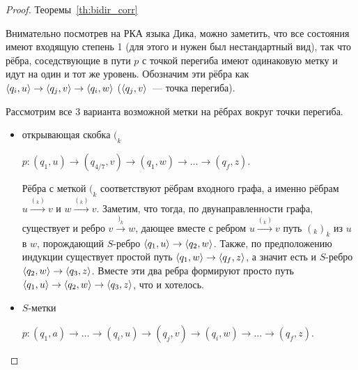 \begin{proof}{Теоремы~\ref{th:bidir_corr}}



  Внимательно посмотрев на РКА языка Дика, можно заметить, что все состояния имеют входящую степень 1 (для этого и нужен был нестандартный вид), так что рёбра, соседствующие в пути $p$ с точкой перегиба имеют одинаковую метку и идут на один и тот же уровень. Обозначим эти рёбра как $\langle q_i, u \rangle \rightarrow \langle q_j, v \rangle \rightarrow \langle q_i, w \rangle$ ($\langle q_j, v \rangle$~--- точка перегиба).

  Рассмотрим все 3 варианта возможной метки на рёбрах вокруг точки перегиба.



  \begin{itemize}
    \item открывающая скобка $(_k$

      $p \colon (q_1, u) \rightarrow (q_{4/7}, v) \rightarrow (q_1, w) \rightarrow \dots \rightarrow (q_f, z)$.

      Рёбра с меткой $(_k$ соответствуют рёбрам входного графа, а именно рёбрам $u \xrightarrow{(_k)} v$ и $w \xrightarrow{(_k)} v$. Заметим, что тогда, по двунаправленности графа, существует и ребро $v \xrightarrow{)_k} w$, дающее вместе с ребром $u \xrightarrow{(_k)} v $ путь $(_k )_k$ из $u$ в $w$, порождающий $S$-ребро $\langle q_1, u \rangle \rightarrow \langle q_2, w \rangle$. Также, по предположению индукции существует простой путь $\langle q_1, w \rangle \rightarrow \langle q_f, z \rangle$, а значит есть и $S$-ребро $\langle q_2, w \rangle \rightarrow \langle q_3, z \rangle$. Вместе эти два ребра формируют просто путь $\langle q_1, u \rangle \rightarrow \langle q_2, w \rangle \rightarrow \langle q_3, z \rangle$, что и хотелось.

    \item $S$-метки

      $p \colon (q_1, a) \rightarrow \dots \rightarrow (q_i, u) \rightarrow (q_j, v) \rightarrow (q_i, w) \rightarrow \dots \rightarrow (q_f, z)$.


\end{itemize}
\end{proof}
